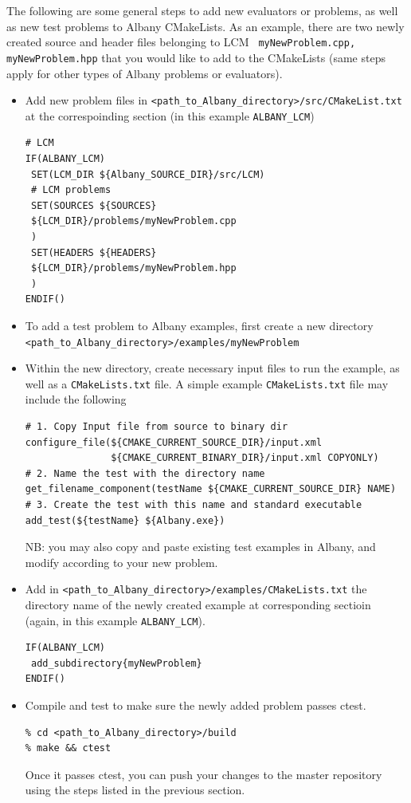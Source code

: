 \documentclass[pdf,12pt,report,strict]{SANDreport}
\theoremstyle{remark}
\begin{document}
The following are some general steps to add new evaluators or problems, as well as new test problems to Albany CMakeLists. As an example, there are two newly created source and header files belonging to LCM \verb+ myNewProblem.cpp, myNewProblem.hpp+ that you would like to add to the CMakeLists (same steps apply for other types of Albany problems or evaluators). 
\begin{itemize}
\item Add new problem files in \verb+<path_to_Albany_directory>/src/CMakeList.txt+ at the correspoinding section (in this example \verb+ALBANY_LCM+)
\begin{verbatim}
# LCM
IF(ALBANY_LCM)
 SET(LCM_DIR ${Albany_SOURCE_DIR}/src/LCM)
 # LCM problems
 SET(SOURCES ${SOURCES}
 ${LCM_DIR}/problems/myNewProblem.cpp
 )
 SET(HEADERS ${HEADERS}
 ${LCM_DIR}/problems/myNewProblem.hpp
 )
ENDIF()
\end{verbatim}

\item To add a test problem to Albany examples, first create a new directory \verb+<path_to_Albany_directory>/examples/myNewProblem+

\item Within the new directory, create necessary input files to run the example, as well as a \verb+CMakeLists.txt+ file. A simple example \verb+CMakeLists.txt+ file may include the following 
\begin{verbatim}
# 1. Copy Input file from source to binary dir
configure_file(${CMAKE_CURRENT_SOURCE_DIR}/input.xml
               ${CMAKE_CURRENT_BINARY_DIR}/input.xml COPYONLY)
# 2. Name the test with the directory name
get_filename_component(testName ${CMAKE_CURRENT_SOURCE_DIR} NAME)
# 3. Create the test with this name and standard executable
add_test(${testName} ${Albany.exe})
\end{verbatim}
NB: you may also copy and paste existing test examples in Albany, and modify according to your new problem. 

\item Add in \verb+<path_to_Albany_directory>/examples/CMakeLists.txt+ the directory name of the newly created example at corresponding sectioin (again, in this example \verb+ALBANY_LCM+). 
\begin{verbatim}
IF(ALBANY_LCM)
 add_subdirectory{myNewProblem}  
ENDIF()
\end{verbatim}

\item Compile and test to make sure the newly added problem passes ctest. 
\begin{verbatim}
% cd <path_to_Albany_directory>/build
% make && ctest
\end{verbatim}
Once it passes ctest, you can push your changes to the master repository using the steps listed in the previous section.
\end{itemize}
\end{document}

